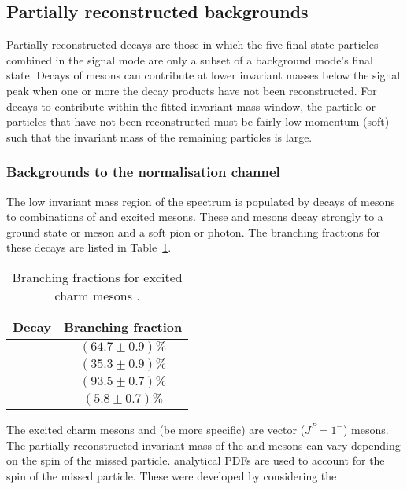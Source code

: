 \subsection{Partially reconstructed backgrounds}
\label{sec:B2DsKK_partrecocomps}

Partially reconstructed decays are those in which the five final state particles combined in the signal mode are only a subset of a background mode's final state.
Decays of \B mesons can contribute at lower invariant masses below the signal peak when one or more the decay products have not been reconstructed. 
For decays to contribute within the fitted \Bp invariant mass window, the particle or particles that have not been reconstructed must be fairly low-momentum (soft) such that the invariant mass of the remaining particles is large.

\subsubsection{Backgrounds to the normalisation channel}

The low invariant mass region of the \Dsp\Dzb spectrum is populated by decays of \Bp mesons to combinations of \D and excited \D mesons. These \Dstarzb and \Dss mesons decay strongly to a ground state \Dzb or \Dsp meson and a soft pion or photon. The branching fractions for these decays are listed in Table~\ref{tab:dstar_BFs}.


\begin{table}[h]
\centering
\begin{tabular}{ l c }

\hline
Decay                           & Branching fraction \\ 
\hline
\decay{\Dstarzb}{\Dzb\Pgamma}   &   $(64.7\pm0.9)\%$ \\
\decay{\Dstarzb}{\Dzb\piz}      &   $(35.3\pm0.9)\%$ \\
\decay{\Dssp}{\Dsp\Pgamma}        &   $(93.5\pm0.7)\%$ \\
\decay{\Dssp}{\Dsp\piz}           &   $(5.8\pm0.7)\%$ \\
\hline

\end{tabular}
\caption{Branching fractions for excited charm mesons \cite{PDG2016}. } 
\label{tab:dstar_BFs}  
\end{table}

The excited charm mesons \Dstarzb and \Dss (be more specific) are vector ($J^{P} = 1^{-}$) mesons. The partially reconstructed invariant mass of the \Dsp and \Dzb mesons can vary depending on the spin of the missed particle.
analytical PDFs are used to account for the spin of the missed particle. These were developed by considering the 

